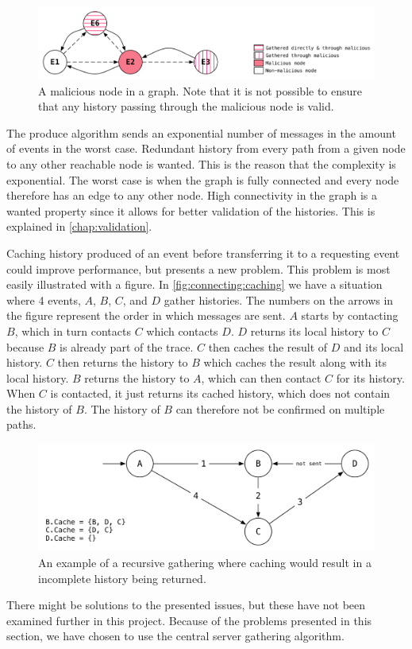 	\begin{figure}[H]
		\centering
		\includegraphics[width=\textwidth]{4connect/images/recursive-evil-node.pdf}
		\caption{A malicious node in a graph. Note that it is not possible to ensure that any history passing through the malicious node is valid.}
		\label{fig:connecting:recursive-evil-node}
	\end{figure}
	
	\noindent The produce algorithm sends an exponential number of messages in the amount of events in the worst case. Redundant history from every path from a given node to any other reachable node is wanted. This is the reason that the complexity is exponential. The worst case is when the graph is fully connected and every node therefore has an edge to any other node. High connectivity in the graph is a wanted property since it allows for better validation of the histories. This is explained in \autoref{chap:validation}.
	
	\newpar Caching history produced of an event before transferring it to a requesting event could improve performance, but presents a new problem. This problem is most easily illustrated with a figure. In \autoref{fig:connecting:caching} we have a situation where 4 events, $A$, $B$, $C$, and $D$ gather histories. The numbers on the arrows in the figure represent the order in which messages are sent. $A$ starts by contacting $B$, which in turn contacts $C$ which contacts $D$. $D$ returns its local history to $C$ because $B$ is already part of the trace. $C$ then caches the result of $D$ and its local history. $C$ then returns the history to $B$ which caches the result along with its local history. $B$ returns the history to $A$, which can then contact $C$ for its history. When $C$ is contacted, it just returns its cached history, which does not contain the history of $B$. The history of $B$ can therefore not be confirmed on multiple paths.
	
	\begin{figure}[H]
		\centering
		\includegraphics[height=0.20\textheight]{4connect/images/caching.pdf}
		\caption{An example of a recursive gathering where caching would result in a incomplete history being returned.}
		\label{fig:connecting:caching}
	\end{figure}
	
	\noindent There might be solutions to the presented issues, but these have not been examined further in this project. Because of the problems presented in this section, we have chosen to use the central server gathering algorithm.